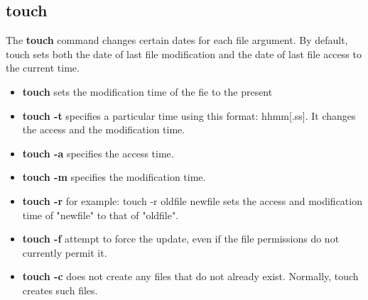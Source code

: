 \documentclass[10pt,a4paper]{scrartcl}
\begin{document}
\begin{description}
\subsection{touch}
\begin{singlespacing}
The {\bf touch} command changes certain dates for each file argument. By default, touch sets both the date of last file modification and the date of last file access to the current time.
\end{singlespacing}
\begin{doublespacing}
\begin{itemize}
\item{\bf{touch}} \qquad sets the modification time of the fie to the present
\item{\bf{touch -t}} \qquad specifies a particular time using this format:\newline
\qquad [cc][yy][MM][dd]hhmm[.ss]. It changes the access and the modification time.
\item{\bf{touch -a}} \qquad specifies the access time.
\item{\bf{touch -m}} \qquad specifies the modification time.
\item{\bf{touch -r}} \qquad for example: touch -r oldfile newfile \newline
\qquad sets the access and modification time of "newfile" to that of "oldfile".
\item{\bf{touch -f}} \qquad  attempt to force the update, even if the file permissions do not currently permit it. 
\item{\bf{touch -c}} \qquad     does not create any files that do not already exist. Normally, touch creates such files.
\end{itemize}
\end{doublespacing}


\end{description}
\end{document}
